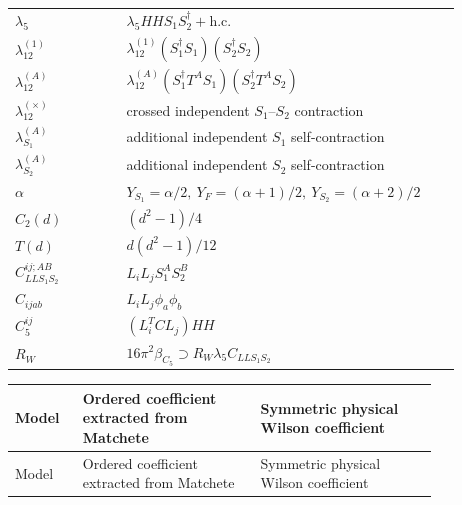 \documentclass[8pt]{article}
\begin{document}
\begin{landscape}
\begin{longtable}{@{}p{0.23\linewidth}p{0.69\linewidth}@{}}
$\lambda_5$ & $\lambda_5HHS_1S_2^\dagger+\mathrm{h.c.}$ \\
$\lambda_{12}^{(1)}$ & $\lambda_{12}^{(1)}(S_1^\dagger S_1)(S_2^\dagger S_2)$ \\
$\lambda_{12}^{(A)}$ & $\lambda_{12}^{(A)}(S_1^\dagger T^AS_1)(S_2^\dagger T^AS_2)$ \\
$\lambda_{12}^{(\times)}$ & crossed independent $S_1$--$S_2$ contraction \\
$\lambda_{S_1}^{(A)}$ & additional independent $S_1$ self-contraction \\
$\lambda_{S_2}^{(A)}$ & additional independent $S_2$ self-contraction \\
$\alpha$ & $Y_{S_1}=\alpha/2,\ Y_F=(\alpha+1)/2,\ Y_{S_2}=(\alpha+2)/2$ \\
$C_2(d)$ & $(d^2-1)/4$ \\
$T(d)$ & $d(d^2-1)/12$ \\
$C_{LLS_1S_2}^{ij;AB}$ & $L_iL_jS_1^AS_2^B$ \\
$C_{ijab}$ & $L_iL_j\phi_a\phi_b$ \\
$C_5^{ij}$ & $(L_i^TCL_j)HH$ \\
$R_W$ & $16\pi^2\beta_{C_5}\supset R_W\lambda_5C_{LLS_1S_2}$ \\
\bottomrule
\end{longtable}
\scriptsize
\begin{longtable}{@{}l >{\raggedright\arraybackslash}p{0.42\linewidth} >{\raggedright\arraybackslash}p{0.42\linewidth}@{}}
\toprule
Model & Ordered coefficient extracted from Matchete & Symmetric physical Wilson coefficient \\
\midrule
\endfirsthead
\toprule
Model & Ordered coefficient extracted from Matchete & Symmetric physical Wilson coefficient \\
\midrule
\endhead

\end{longtable}
\end{landscape}
\end{document}
